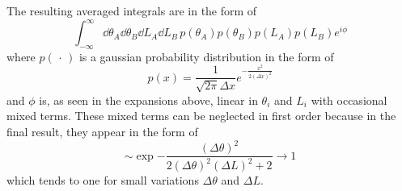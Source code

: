 The resulting averaged integrals are in the form of
\begin{equation}
  \int_{-\infty}^{\infty} \dd \theta_A \dd \theta_B \dd L_A \dd L_B \, p(\theta_A) p(\theta_B) p(L_A) p(L_B) e^{i \phi}
\end{equation}
where $p(\,\cdot\,)$ is a gaussian probability distribution in the form of
\begin{equation}
  p(x) = \frac{1}{\sqrt{2\pi}\Delta x} e^{-\frac{x^2}{2(\Delta x)^2}}
\end{equation}
and $\phi$ is, as seen in the expansions above, linear in $\theta_i$ and $L_i$ with occasional mixed terms.
These mixed terms can be neglected in first order because in the final result, they appear in the form of
\begin{equation}
  \sim \exp{-\frac{(\Delta \theta)^2}{2(\Delta \theta)^2(\Delta L)^2 + 2}} \rightarrow 1
\end{equation}
which tends to one for small variations $\Delta \theta$ and $\Delta L$.